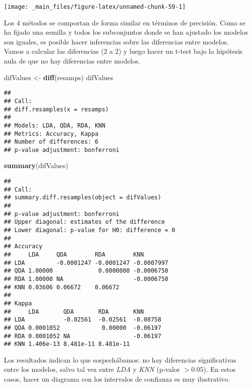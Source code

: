 \documentclass[]{book}
\newenvironment{Shaded}{\begin{snugshade}}{\end{snugshade}}
\newcommand{\KeywordTok}[1]{\textcolor[rgb]{0.13,0.29,0.53}{\textbf{#1}}}
\newcommand{\NormalTok}[1]{#1}
\newcommand{\StringTok}[1]{\textcolor[rgb]{0.31,0.60,0.02}{#1}}
\begin{document}
\begin{center}\texttt{[image: \_main\_files/figure-latex/unnamed-chunk-59-1]} \end{center}

Los 4 métodos se comportan de forma similar en términos de precisión. Como se ha fijado una semilla y todos los subconjuntos donde se han ajustado los modelos son iguales, es posible hacer inferencias sobre las diferencias entre modelos. Vamos a calcular las diferencias (2 a 2) y luego hacer un t-test bajo la hipótesis nula de que no hay diferencias entre modelos.

\begin{Shaded}
\begin{Highlighting}[]
\NormalTok{difValues <-}\StringTok{ }\KeywordTok{diff}\NormalTok{(resamps)}
\NormalTok{difValues}
\end{Highlighting}
\end{Shaded}

\begin{verbatim}
## 
## Call:
## diff.resamples(x = resamps)
## 
## Models: LDA, QDA, RDA, KNN 
## Metrics: Accuracy, Kappa 
## Number of differences: 6 
## p-value adjustment: bonferroni
\end{verbatim}

\begin{Shaded}
\begin{Highlighting}[]
\KeywordTok{summary}\NormalTok{(difValues)}
\end{Highlighting}
\end{Shaded}

\begin{verbatim}
## 
## Call:
## summary.diff.resamples(object = difValues)
## 
## p-value adjustment: bonferroni 
## Upper diagonal: estimates of the difference
## Lower diagonal: p-value for H0: difference = 0
## 
## Accuracy 
##     LDA     QDA        RDA        KNN       
## LDA         -0.0001247 -0.0001247 -0.0007997
## QDA 1.00000             0.0000000 -0.0006750
## RDA 1.00000 NA                    -0.0006750
## KNN 0.03606 0.06672    0.06672              
## 
## Kappa 
##     LDA       QDA       RDA       KNN     
## LDA           -0.02561  -0.02561  -0.08758
## QDA 0.0001052            0.00000  -0.06197
## RDA 0.0001052 NA                  -0.06197
## KNN 1.406e-13 8.481e-11 8.481e-11
\end{verbatim}

Los resultados indican lo que sospechábamos: no hay diferencias significativas entre los modelos, salvo tal vez entre \emph{LDA} y \emph{KNN} (p-valor \(> 0.05\)). En estos casos, hacer un diagrama con los intervalos de confianza es muy ilustrativo.
\end{document}
